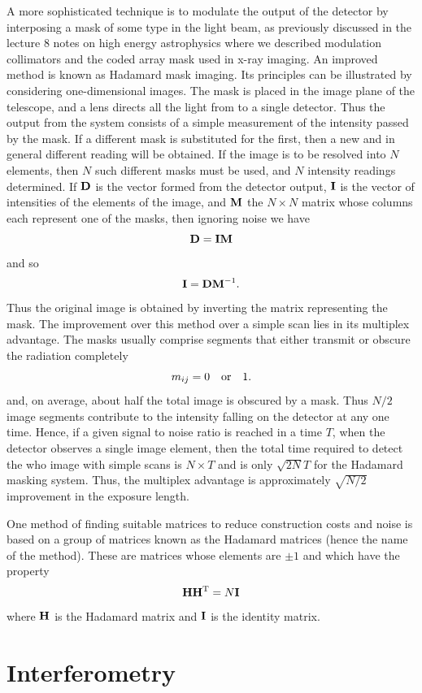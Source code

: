 A more sophisticated technique is to modulate the output of the detector by interposing a mask of some type in the light beam, as previously discussed in the lecture 8 notes on high energy astrophysics where we described modulation collimators and the coded array mask used in x-ray imaging. An improved method is known as Hadamard mask imaging. Its principles can be illustrated by considering one-dimensional images. The mask is placed in the image plane of the telescope, and a lens directs all the light from to a single detector. Thus the output from the system consists of a simple measurement of the intensity passed by the mask. If a different mask is substituted for the first, then a new and in general different reading will be obtained. If the image is to be resolved into
$N$ elements, then $N$ such different masks must be used, and $N$ intensity readings determined. If ${\bf D}$ is the vector formed from the detector output, ${\bf I}$ is the vector of intensities of the elements of the image, and ${\bf M}$ the $N\times N$ matrix whose columns each represent one of the masks, then ignoring noise we have
\[
{\bf D}={\bf IM}
\]
and so 
\[
{\bf I}={\bf DM}^{-1}.
\]
Thus the original image is obtained by inverting the matrix representing the mask. The improvement over this method over a simple scan lies in its multiplex advantage. The masks usually comprise segments that either transmit or obscure the radiation completely 
\[ 
m_{ij}=0 \quad {\rm or} \quad 1.
\]
and, on average, about half the total image is obscured by a mask. Thus $N/2$ image segments contribute to the intensity falling on the detector at any one time. Hence, if 
a given signal to noise ratio is reached in a time $T$, when the detector observes a single image element, then the total time required to detect the who image with simple scans is $N\times T$ and is only $\sqrt{2N}T$ for the Hadamard masking system. Thus, the multiplex advantage is approximately $\sqrt{N/2}$ improvement in the exposure length. 

One method of finding suitable matrices to reduce construction costs and noise is based on a group of matrices known as the Hadamard matrices (hence the name of the method). These are matrices whose elements are $\pm 1$ and which have the property
\[
{\bf H}{\bf H}^{\rm T}=N{\bf I}
\]
where ${\bf H}$ is the Hadamard matrix and ${\bf I}$ is the identity matrix. 

\section{Interferometry}

